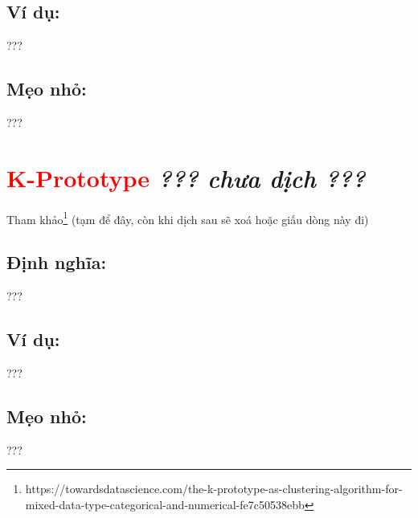 \subsection*{Ví dụ:}
???
\subsection*{Mẹo nhỏ:}
???
\section*{\huge \textcolor{Red}{K-Prototype}  \small \textit{??? chưa dịch ???} }
Tham khảo\footnote{https://towardsdatascience.com/the-k-prototype-as-clustering-algorithm-for-mixed-data-type-categorical-and-numerical-fe7c50538ebb} (tạm để đây, còn khi dịch sau sẽ xoá hoặc giấu dòng này đi)
\subsection*{Định nghĩa:}
???
\subsection*{Ví dụ:}
???
\subsection*{Mẹo nhỏ:}
???
